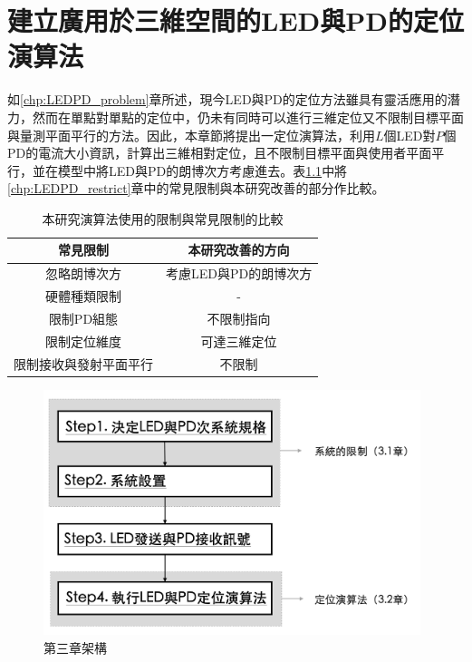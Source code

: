 \chapter{建立廣用於三維空間的LED與PD的定位演算法}
\label{chp:3}

如\ref{chp:LEDPD_problem}章所述，現今LED與PD的定位方法雖具有靈活應用的潛力，然而在單點對單點的定位中，仍未有同時可以進行三維定位又不限制目標平面與量測平面平行的方法。因此，本章節將提出一定位演算法，利用$L$個LED對$P$個PD的電流大小資訊，計算出三維相對定位，且不限制目標平面與使用者平面平行，並在模型中將LED與PD的朗博次方考慮進去。表\ref{tab:restrict_compare}中將\ref{chp:LEDPD_restrict}章中的常見限制與本研究改善的部分作比較。


\begin{table}[htpb]
    \begin{center}
      \caption{本研究演算法使用的限制與常見限制的比較}
      \label{tab:restrict_compare}
      \begin{tabular}{|c|c|} 
        \hline
         常見限制 &
          \textbf{本研究改善的方向}\\\hline
          忽略朗博次方&考慮LED與PD的朗博次方\\
          硬體種類限制& - \\
          限制PD組態& 不限制指向\\
          限制定位維度&可達三維定位\\
          限制接收與發射平面平行&不限制\\
        \hline
      \end{tabular}
    \end{center}
  \end{table}

\begin{figure}[htpb]
    \centering
    \includegraphics[width=11cm]{ch3pic/chp3_flow.png}
    \caption{第三章架構}
    \label{pic:chp3_flow}
\end{figure}


